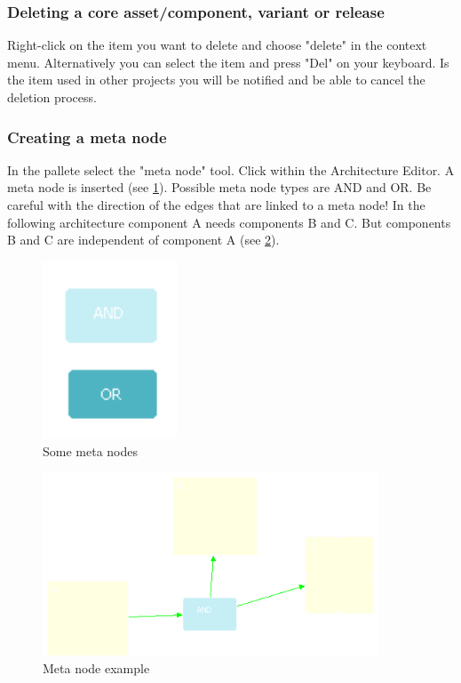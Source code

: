 \subsubsection{Deleting a core asset/component, variant or release}

Right-click on the item you want to delete and choose "delete" in the context
menu. Alternatively you
can select the item and press "Del" on your keyboard. Is the item used in other projects
you will be notified and be able to cancel the deletion process.


\subsubsection{Creating a meta node}

In the pallete select the "meta node" tool. Click within the Architecture Editor. 
A meta node is inserted (see \ref{meta}). Possible meta node types are AND and OR. Be careful with
the direction of the edges that are linked to a meta node! In the following architecture component A
needs components B and C. But components B and C are independent of component A (see \ref{example}).

\begin{figure}[h!]
\begin{center}
\includegraphics[width=4cm]{metanode.png}
   \caption{Some meta nodes}
\label{meta}
\end{center}
\end{figure}\par

\begin{figure}[h!]
\begin{center}
\includegraphics[width=10cm]{example.png}
   \caption{Meta node example}
\label{example}
\end{center}
\end{figure}\par

